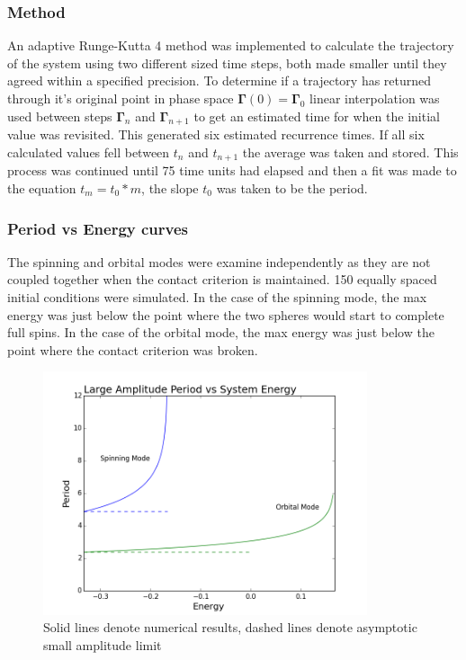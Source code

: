 \documentclass[prbg,preprint]{revtex4-1}
\begin{document}
\subsubsection{Method}
An adaptive Runge-Kutta 4 method was implemented to calculate the trajectory of the system using two different sized time steps, both made smaller until they agreed within a specified precision. To determine if a trajectory has returned through it's original point in phase space $\boldsymbol{\Gamma}(0)=\boldsymbol{\Gamma}_0$ linear interpolation was used between steps $\boldsymbol{\Gamma}_n$ and $\boldsymbol{\Gamma}_{n+1}$ to get an estimated time for when the initial value was revisited. This generated six estimated recurrence times. If all six calculated values fell between $t_n$ and $t_{n+1}$ the average was taken and stored. This process was continued until 75 time units had elapsed and then a fit was made to the equation $t_m = t_0*m$, the slope $t_0$ was taken to be the period.

\subsubsection{Period vs Energy curves}
The spinning and orbital modes were examine independently as they are not coupled together when the contact criterion is maintained. 150 equally spaced initial conditions were simulated. In the case of the spinning mode, the max energy was just below the point where the two spheres would start to complete full spins. In the case of the orbital mode, the max energy was just below the point where the contact criterion was broken.

\begin{figure}[h]
	\centering
	\includegraphics[width=0.85\textwidth]{./images/plot.png}
	\caption{Solid lines denote numerical results, dashed lines denote asymptotic small amplitude limit}
\end{figure}
\end{document}
